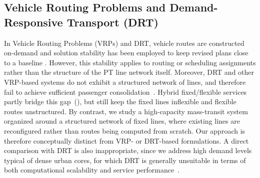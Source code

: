 \documentclass[a4paper,fleqn]{cas-sc}
\begin{document}

\subsection{Vehicle Routing Problems and Demand-Responsive Transport (DRT)}

In Vehicle Routing Problems (VRPs) and DRT, vehicle routes are constructed on-demand and solution stability has been employed to keep revised plans close to a baseline \citep{touzout2021modelling}. However, this stability applies to routing or scheduling assignments rather than the structure of the PT line network itself. Moreover, DRT and other VRP-based systems do not exhibit a structured network of lines, and therefore fail to achieve sufficient passenger consolidation~\citep{Calabro2022}. Hybrid fixed/flexible services partly bridge this gap~(\cite{calabro2023adaptive}), but still keep the fixed lines inflexible and flexible routes unstructured. By contrast, we study a high-capacity mass-transit system organized around a structured network of fixed lines, where existing lines are reconfigured rather than routes being computed from scratch. Our approach is therefore conceptually distinct from VRP- or DRT-based formulations. A direct comparison with DRT is also inappropriate, since we address high demand levels typical of dense urban cores, for which DRT is generally unsuitable in terms of both computational scalability and service performance~\citep{Calabro2022}.





\end{document}
